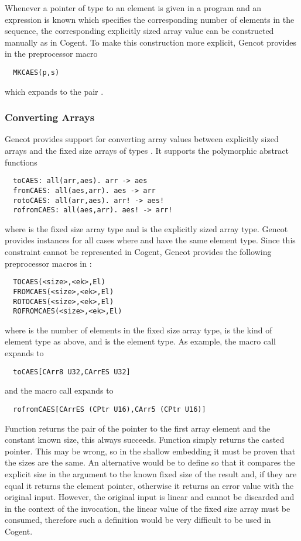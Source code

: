 Whenever a pointer  of type  to an element is given in a program and an expression  
is known which specifies the corresponding number of elements in the sequence, the corresponding explicitly sized array value 
can be constructed manually as  in Cogent. To make this construction more explicit, Gencot provides in 
 the preprocessor macro
\begin{verbatim}
  MKCAES(p,s)
\end{verbatim}
which expands to the pair .

\subsubsection{Converting Arrays}

Gencot provides support for converting array values between explicitly sized arrays and the fixed size arrays of types
. It supports the polymorphic abstract functions
\begin{verbatim}
  toCAES: all(arr,aes). arr -> aes
  fromCAES: all(aes,arr). aes -> arr
  rotoCAES: all(arr,aes). arr! -> aes!
  rofromCAES: all(aes,arr). aes! -> arr!
\end{verbatim}
where  is the fixed size array type and  is the explicitly sized array type. Gencot provides instances
for all cases where  and  have the same element type. Since this constraint cannot be represented in
Cogent, Gencot provides the following preprocessor macros in :
\begin{verbatim}
  TOCAES(<size>,<ek>,El)
  FROMCAES(<size>,<ek>,El)
  ROTOCAES(<size>,<ek>,El)
  ROFROMCAES(<size>,<ek>,El)
\end{verbatim}
where  is the number of elements in the fixed size array type,  is the kind of element type as above, 
and  is the element type. As example, the macro call  expands to
\begin{verbatim}
  toCAES[CArr8 U32,CArrES U32]
\end{verbatim}
and the macro call  expands to
\begin{verbatim}
  rofromCAES[CArrES (CPtr U16),CArr5 (CPtr U16)]
\end{verbatim}

Function  returns the pair of the pointer to the first array element and the constant known size, this
always succeeds. Function  simply returns the casted pointer. This may be wrong, so in the shallow embedding
it must be proven that the sizes are the same. An alternative would be to define  so that it compares the 
explicit size in the argument to the known fixed size of the result and, if they are equal it returns the element pointer, 
otherwise it returns an error value with the original input. However, the original input is linear and cannot be discarded
and in the context of the invocation, the linear value of the fixed size array must be consumed, therefore such a definition
would be very difficult to be used in Cogent.

